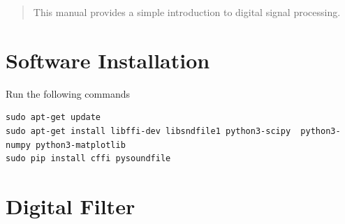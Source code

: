 \documentclass[journal,12pt,twocolumn]{IEEEtran}
\renewcommand\thesection{\arabic{section}}
\begin{document}
% 







\maketitle


\tableofcontents


\renewcommand{\thefigure}{\theenumi}
\renewcommand{\thetable}{\theenumi}



\bigskip

\begin{abstract}
This manual provides a simple introduction to digital signal processing.
\end{abstract}
\section{Software Installation}
Run the following commands
\begin{lstlisting}
sudo apt-get update
sudo apt-get install libffi-dev libsndfile1 python3-scipy  python3-numpy python3-matplotlib 
sudo pip install cffi pysoundfile 
\end{lstlisting}



\section{Digital Filter}
\end{document}

